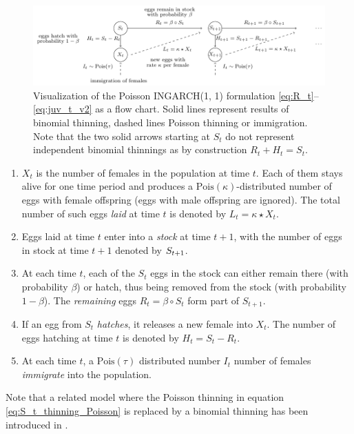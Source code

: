 \documentclass{article}
\begin{document}
\begin{figure}
\center
\includegraphics[scale=0.85]{figure/flowchart_ingarch_poisson.pdf}
\caption{Visualization of the Poisson INGARCH(1, 1) formulation \eqref{eq:R_t}--\eqref{eq:juv_t_v2} as a flow chart. Solid lines represent results of binomial thinning, dashed lines Poisson thinning or immigration. Note that the two solid arrows starting at $S_t$ do not represent independent binomial thinnings as by construction  $R_t + H_t = S_t$.}
\label{fig:ingarch_flowchart_poisson}
\end{figure}

\begin{enumerate}
\item $X_t$ is the number of females in the population at time $t$. Each of them stays alive for one time period and produces a $\text{Pois}(\kappa)$-distributed number of eggs with female offspring (eggs with male offspring are ignored). The total number of such eggs \textit{laid} at time $t$ is denoted by $L_t = \kappa \star X_t$.
\item Eggs laid at time $t$ enter into a \textit{stock} at time $t + 1$, with the number of eggs in stock at time $t + 1$ denoted by $S_{t + 1}$.
\item At each time $t$, each of the $S_t$ eggs in the stock can either remain there (with probability $\beta$) or hatch, thus being removed from the stock (with probability $1 - \beta$). The \textit{remaining} eggs $R_t = \beta \circ S_t$ form part of $S_{t + 1}$.
\item If an egg from $S_t$ \textit{hatches}, it releases a new female into $X_t$. The number of eggs hatching at time $t$ is denoted by $H_t = S_t - R_t$.
\item At each time $t$, a $\text{Pois}(\tau)$ distributed number $I_t$ number of females \textit{immigrate} into the population.
\end{enumerate}

Note that a related model where the Poisson thinning in equation \eqref{eq:S_t_thinning_Poisson} is replaced by a binomial thinning has been introduced in \cite{Bracher2019}.
\end{document}
